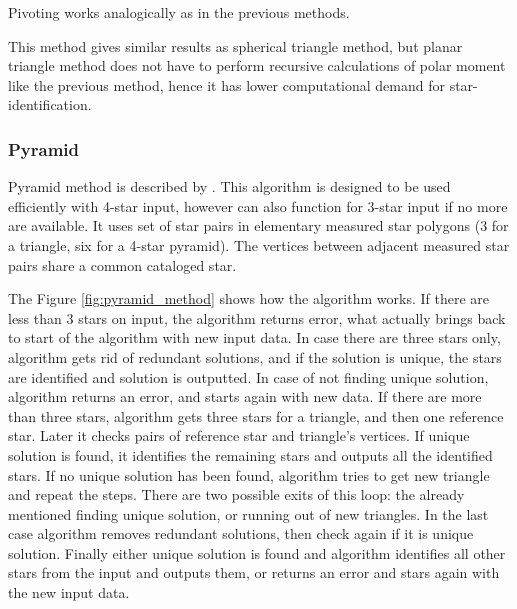 \documentclass[12pt,a4paper,twoside]{article}
\begin{document}
Pivoting works analogically as in the previous methods.

This method gives similar results as spherical triangle method, but planar triangle method does not have to perform recursive calculations of polar moment like the previous method, hence it has lower computational demand for star-identification\cite{alidoost2013review}.	


\subsubsection{Pyramid}

Pyramid method is described by \citet{mortari2004pyramid}. This algorithm is designed to be used efficiently with 4-star input, however can also function for 3-star input if no more are available. It uses set of star pairs in elementary measured star polygons (3 for a triangle, six for a 4-star pyramid). The vertices between adjacent measured star pairs share a common cataloged star.

The Figure \ref{fig:pyramid_method} shows how the algorithm works. If there are less than 3 stars on input, the algorithm returns error, what actually brings back to start of the algorithm with new input data. In case there are three stars only, algorithm gets rid of redundant solutions, and if the solution is unique, the stars are identified and solution is outputted. In case of not finding unique solution, algorithm returns an error, and starts again with new data. If there are more than three stars, algorithm gets three stars for a triangle, and then one reference star. Later it checks pairs of reference star and triangle's vertices. If unique solution is found, it identifies the remaining stars and outputs all the identified stars. If no unique solution has been found, algorithm tries to get new triangle and repeat the steps. There are two possible exits of this loop: the already mentioned finding unique solution, or running out of new triangles. In the last case algorithm removes redundant solutions, then check again if it is unique solution. Finally either unique solution is found and algorithm identifies all other stars from the input and outputs them, or returns an error and stars again with the new input data.
\end{document}

